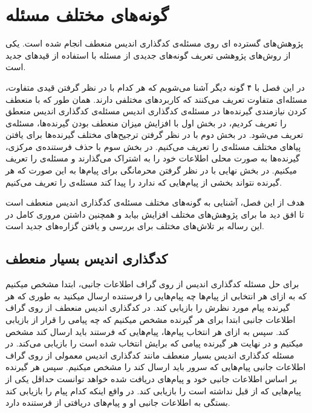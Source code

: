 
\chapter{
    گونه‌های مختلف مسئله
}
پژوهش‌های گسترده ای روی مسئله‌ی کدگذاری اندیس منعطف انجام شده است. یکی از روش‌های پژوهشی تعریف گونه‌های جدیدی از مسئله با استفاده از قیدهای جدید است.

در این فصل با ۴ گونه دیگر آشنا می‌شویم که هر کدام با در نظر گرفتن قیدی متفاوت، مسئله‌ای متفاوت تعریف می‌کنند که کاربردهای مختلفی دارند. همان طور که با منعطف کردن نیازمندی گیرنده‌ها در مسئله‌ی کدگذاری اندیس مسئله‌ی کدگذاری اندیس منعطق را تعریف کردیم، در بخش اول با افزایش میزان منعطف بودن گیرنده‌ها، مسئله‌ی 
 تعریف می‌شود. در بخش دوم با در نظر گرفتن ترجیح‌های مختلف گیرنده‌ها برای یافتن پیا‌های مختلف مسئله‌ی
 را تعریف می‌کنیم. در بخش سوم با حذف فرستنده‌ی مرکزی، گیرنده‌ها به صورت محلی اطلاعات خود را به اشتراک می‌گذارند و مسئله‌ی
 را تعریف میکنیم. در بخش نهایی با در نظر گرفتن محرمانگی برای پیام‌ها به این صورت که هر گیرنده نتواند بخشی از پیام‌هایی که ندارد را پیدا کند مسئله‌ی
 را تعریف می‌کنیم.
 
 هدف از این فصل، آشنایی به گونه‌های مختلف مسئله‌ی کدگذاری اندیس منعطف است تا افق دید ما برای پژوهش‌های مختلف افزایش بیابد و همچنین داشتن مروری کامل در این رساله بر تلاش‌های مختلف برای بررسی و یافتن گزاره‌های جدید است.

\section{کدگذاری اندیس بسیار منعطف}
\label{def:verypliable}
برای حل مسئله کدگذاری اندیس از روی گراف اطلاعات جانبی، ابتدا مشخص میکنیم که به ازای هر انتخابی از پیام‌ها چه پیام‌هایی را فرستنده ارسال میکنید به طوری که هر گیرنده پیام مورد نظرش را بازیابی کند. در کدگذاری اندیس منعطف از روی گراف اطلاعات جانبی ابتدا برای هر گیرنده مشخص میکنیم که چه پیامی را قرار از بازیابی کند. سپس به ازای هر انتخاب پیام‌ها، پیام‌هایی که فرستند باید ارسال کند مشخص میکنیم و در نهایت هر گیرنده پیامی که برایش انتخاب شده است را بازیابی می‌کند. در مسئله کدگذاری اندیس بسیار منعطف مانند کدگذاری اندیس معمولی از روی گراف اطلاعات جانبی پیام‌هایی که سرور باید ارسال کند را مشخص میکنیم. سپس هر گیرنده بر اساس اطلاعات جانبی خود و پیام‌های دریافت شده خواهد توانست حداقل یکی از پیام‌هایی که از قبل نداشته است را بازیابی کند. در واقع اینکه کدام پیام را بازیابی کند بستگی به اطلاعات جانبی او و پیام‌های دریافتی از فرستنده دارد.

